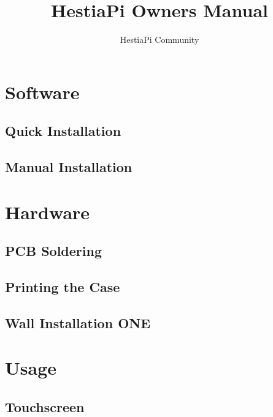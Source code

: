 \documentclass{article}
\begin{document}
\title{HestiaPi Owners Manual}
\author{HestiaPi Community}
\maketitle


\section{Software}
\subsection{Quick Installation}


\subsection{Manual Installation}



\section{Hardware}
\subsection{PCB Soldering}


\subsection{Printing the Case}


\subsection{Wall Installation ONE}



\section{Usage}
\subsection{Touchscreen}

%
%
\end{document}
